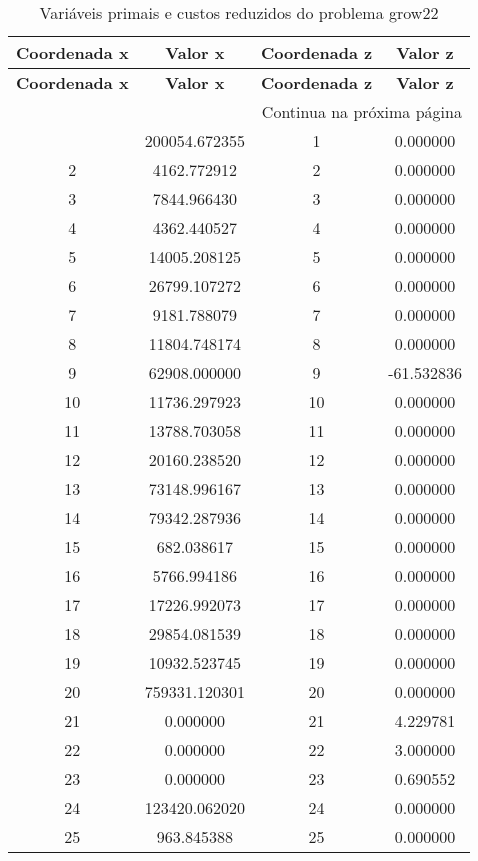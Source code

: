 \documentclass[12pt]{article}
\begin{document}
\begin{longtable}{@{}cccc@{}}
\caption{Variáveis primais e custos reduzidos do problema grow22} \\
\toprule
\textbf{Coordenada x} & \textbf{Valor x} & \textbf{Coordenada z} & \textbf{Valor z} \\
\midrule
\endfirsthead

\toprule
\textbf{Coordenada x} & \textbf{Valor x} & \textbf{Coordenada z} & \textbf{Valor z} \\
\midrule
\endhead

\midrule \multicolumn{4}{r}{{Continua na próxima página}} \\ \midrule
\endfoot

\bottomrule
\endlastfoot
1 & 200054.672355 & 1 & 0.000000 \\
2 & 4162.772912 & 2 & 0.000000 \\
3 & 7844.966430 & 3 & 0.000000 \\
4 & 4362.440527 & 4 & 0.000000 \\
5 & 14005.208125 & 5 & 0.000000 \\
6 & 26799.107272 & 6 & 0.000000 \\
7 & 9181.788079 & 7 & 0.000000 \\
8 & 11804.748174 & 8 & 0.000000 \\
9 & 62908.000000 & 9 & -61.532836 \\
10 & 11736.297923 & 10 & 0.000000 \\
11 & 13788.703058 & 11 & 0.000000 \\
12 & 20160.238520 & 12 & 0.000000 \\
13 & 73148.996167 & 13 & 0.000000 \\
14 & 79342.287936 & 14 & 0.000000 \\
15 & 682.038617 & 15 & 0.000000 \\
16 & 5766.994186 & 16 & 0.000000 \\
17 & 17226.992073 & 17 & 0.000000 \\
18 & 29854.081539 & 18 & 0.000000 \\
19 & 10932.523745 & 19 & 0.000000 \\
20 & 759331.120301 & 20 & 0.000000 \\
21 & 0.000000 & 21 & 4.229781 \\
22 & 0.000000 & 22 & 3.000000 \\
23 & 0.000000 & 23 & 0.690552 \\
24 & 123420.062020 & 24 & 0.000000 \\
25 & 963.845388 & 25 & 0.000000 \\

\end{longtable}
\end{document}
